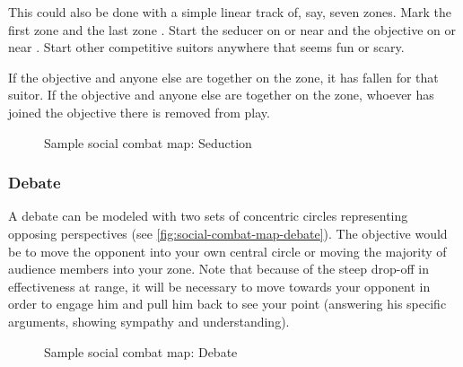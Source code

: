 This could also be done with a simple linear track of, say, seven zones. Mark the first zone \LOVERS{} and the last zone \JUSTFRIENDS{}. Start the seducer on or near \LOVERS{} and the objective on or near \JUSTFRIENDS{}. Start other competitive suitors anywhere that seems fun or scary.

If the objective and anyone else are together on the \LOVERS{} zone, it has fallen for that suitor. If the objective and anyone else are together on the \JUSTFRIENDS{} zone, whoever has joined the objective there is removed from play.

\begin{figure}
\centering\footnotesize

\caption{Sample social combat map: Seduction}
\label{fig:social-combat-map-seduction}
\end{figure}

\clearpage

\subsubsection{Debate}

A debate can be modeled with two sets of concentric circles representing opposing perspectives (see \autoref{fig:social-combat-map-debate}). The objective would be to move the opponent into your own central circle or moving the majority of audience members into your zone. Note that because of the steep drop-off in effectiveness at range, it will be necessary to move towards your opponent in order to engage him and pull him back to see your point (answering his specific arguments, showing sympathy and understanding).


\begin{figure}
\centering\footnotesize

\caption{Sample social combat map: Debate}
\label{fig:social-combat-map-debate}
\end{figure}
